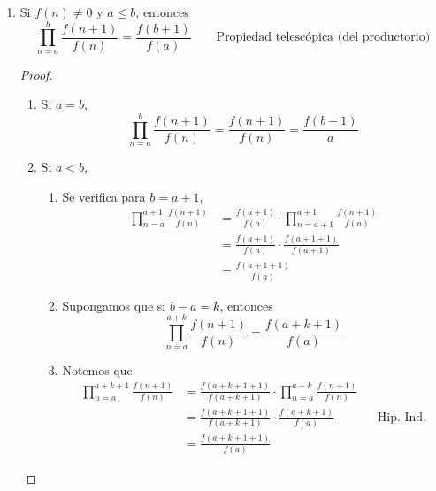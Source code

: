 \begin{enumerate}[label=\alph*)]
    \item Si $f(n)\neq 0$ y $a\leq b$, entonces \[\prod_{n=a}^{b} \frac{f(n+1)}{f(n)} = \frac{f(b+1)}{f(a)} \qquad \text{Propiedad telescópica (del productorio)}\]
    \begin{proof}\leavevmode
      \begin{enumerate}[label=\Roman*)]
        \item Si $a=b$, \[\prod_{n=a}^{b} \frac{f(n+1)}{f(n)} = \frac{f(n+1)}{f(n)} = \frac{f(b+1)}{a}\]
        \item Si $a<b$,
        \begin{enumerate}[label=\roman*)]
          \item Se verifica para $b=a+1$,
          \begin{align*}
            \prod_{n=a}^{a+1} \frac{f(n+1)}{f(n)} &= \frac{f(a+1)}{f(a)} \cdot \prod_{n=a+1}^{a+1} \frac{f(n+1)}{f(n)}\\
            &= \frac{f(a+1)}{f(a)} \cdot \frac{f(a+1+1)}{f(a+1)}\\
            &= \frac{f(a+1+1)}{f(a)}
          \end{align*}
          \item Supongamos que si $b-a=k$, entonces
          \[\prod_{n=a}^{a+k} \frac{f(n+1)}{f(n)} = \frac{f(a+k+1)}{f(a)}\]
          \item Notemos que
          \begin{align*}
            \prod_{n=a}^{a+k+1} \frac{f(n+1)}{f(n)} &= \frac{f(a+k+1+1)}{f(a+k+1)} \cdot \prod_{n=a}^{a+k} \frac{f(n+1)}{f(n)}\\
            &= \frac{f(a+k+1+1)}{f(a+k+1)} \cdot \frac{f(a+k+1)}{f(a)} && \text{Hip. Ind.}\\
            &= \frac{f(a+k+1+1)}{f(a)}
          \end{align*}
        \end{enumerate}
      \end{enumerate}
    \end{proof}
    

\end{enumerate}
